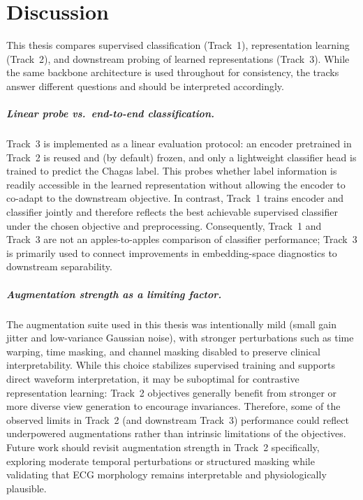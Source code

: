 \chapter{Discussion}
\label{ch:discussion}

This thesis compares supervised classification (Track~1), representation learning (Track~2), and downstream probing of learned representations (Track~3).
While the same backbone architecture is used throughout for consistency, the tracks answer different questions and should be interpreted accordingly.

\paragraph{Linear probe vs.\ end-to-end classification.}
Track~3 is implemented as a linear evaluation protocol: an encoder pretrained in Track~2 is reused and (by default) frozen, and only a lightweight classifier head is trained to predict the Chagas label.
This probes whether label information is readily accessible in the learned representation without allowing the encoder to co-adapt to the downstream objective.
In contrast, Track~1 trains encoder and classifier jointly and therefore reflects the best achievable supervised classifier under the chosen objective and preprocessing.
Consequently, Track~1 and Track~3 are not an apples-to-apples comparison of classifier performance; Track~3 is primarily used to connect improvements in embedding-space diagnostics to downstream separability.

\paragraph{Augmentation strength as a limiting factor.}
The augmentation suite used in this thesis was intentionally mild (small gain jitter and low-variance Gaussian noise), with stronger perturbations such as time warping, time masking, and channel masking disabled to preserve clinical interpretability.
While this choice stabilizes supervised training and supports direct waveform interpretation, it may be suboptimal for contrastive representation learning: Track~2 objectives generally benefit from stronger or more diverse view generation to encourage invariances.
Therefore, some of the observed limits in Track~2 (and downstream Track~3) performance could reflect underpowered augmentations rather than intrinsic limitations of the objectives.
Future work should revisit augmentation strength in Track~2 specifically, exploring moderate temporal perturbations or structured masking while validating that ECG morphology remains interpretable and physiologically plausible.
